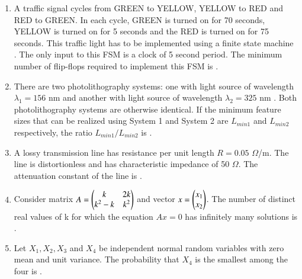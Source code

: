 \documentclass[a4paper, 11pt]{article}
\begin{document}
\begin{enumerate}
    \hfill{}
    
    \item A traffic signal cycles from GREEN to YELLOW, YELLOW to RED and RED to GREEN. In each cycle, GREEN is turned on for 70 seconds, YELLOW is turned on for 5 seconds and the RED is turned on for 75 seconds. This traffic light has to be implemented using a finite state machine . The only input to this FSM is a clock of 5 second period. The minimum number of flip-flops required to implement this FSM is \underline{\hspace{2cm}}.

    \hfill{}

    \item There are two photolithography systems: one with light source of wavelength $\lambda_1 = 156$ nm  and another with light source of wavelength $\lambda_2 = 325$ nm . Both photolithography systems are otherwise identical. If the minimum feature sizes that can be realized using System 1 and System 2 are $L_{min1}$ and $L_{min2}$ respectively, the ratio $L_{min1}/L_{min2}$  is \underline{\hspace{2cm}}.
    
    \hfill{}

    \item A lossy transmission line has resistance per unit length $R = 0.05$ $\Omega$/m. The line is distortionless and has characteristic impedance of 50 $\Omega$. The attenuation constant  of the line is \underline{\hspace{2cm}}.

    \hfill{}

    \item Consider matrix $A = \begin{pmatrix}k & 2k \\ k^2-k & k^2\end{pmatrix}$ and vector $x = \begin{pmatrix}x_1 \\ x_2\end{pmatrix}$. The number of distinct real values of k for which the equation $Ax=0$ has infinitely many solutions is \underline{\hspace{2cm}}.

    \hfill{}
    
    \item Let $X_1, X_2, X_3$ and $X_4$ be independent normal random variables with zero mean and unit variance. The probability that $X_4$ is the smallest among the four is \underline{\hspace{2cm}}.


\end{enumerate}
\end{document}
